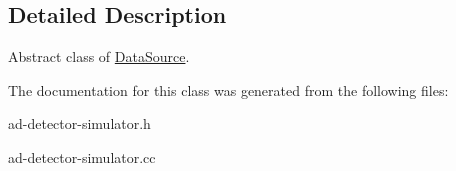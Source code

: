 \subsection{Detailed Description}
Abstract class of \hyperlink{classns3_1_1DataSource}{Data\+Source}. 

The documentation for this class was generated from the following files\+:\begin{DoxyCompactItemize}
\item 
ad-\/detector-\/simulator.\+h\item 
ad-\/detector-\/simulator.\+cc\end{DoxyCompactItemize}
